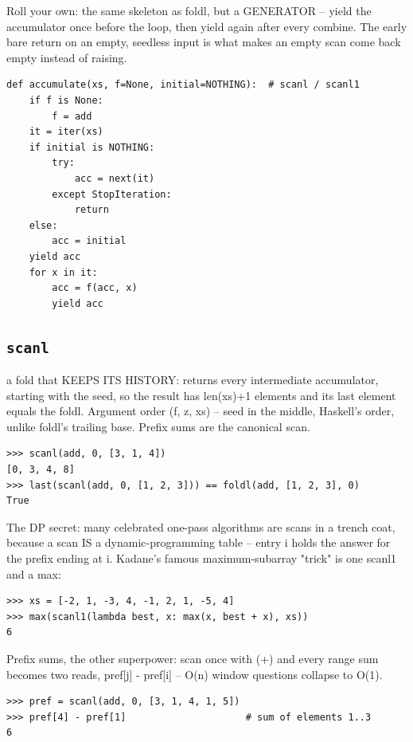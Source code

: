 \documentclass[10pt,letterpaper]{book}
\begin{document}
Roll your own: the same skeleton as foldl, but a GENERATOR -- yield the accumulator once before the loop, then yield again after every combine. The early bare return on an empty, seedless input is what makes an empty scan come back empty instead of raising.

\begin{lstlisting}[style=ex]
def accumulate(xs, f=None, initial=NOTHING):  # scanl / scanl1
    if f is None:
        f = add
    it = iter(xs)
    if initial is NOTHING:
        try:
            acc = next(it)
        except StopIteration:
            return
    else:
        acc = initial
    yield acc
    for x in it:
        acc = f(acc, x)
        yield acc
\end{lstlisting}

\subsection{\texttt{scanl}}\label{def:scanl}
a fold that KEEPS ITS HISTORY: returns every intermediate accumulator, starting with the seed, so the result has len(xs)+1 elements and its last element equals the foldl. Argument order (f, z, xs) -- seed in the middle, Haskell's order, unlike foldl's trailing base. Prefix sums are the canonical scan.
\begin{lstlisting}[style=ex]
>>> scanl(add, 0, [3, 1, 4])
[0, 3, 4, 8]
>>> last(scanl(add, 0, [1, 2, 3])) == foldl(add, [1, 2, 3], 0)
True
\end{lstlisting}

The DP secret: many celebrated one-pass algorithms are scans in a trench coat, because a scan IS a dynamic-programming table -- entry i holds the answer for the prefix ending at i. Kadane's famous maximum-subarray "trick" is one scanl1 and a max:

\begin{lstlisting}[style=ex]
>>> xs = [-2, 1, -3, 4, -1, 2, 1, -5, 4]
>>> max(scanl1(lambda best, x: max(x, best + x), xs))
6
\end{lstlisting}

Prefix sums, the other superpower: scan once with (+) and every range sum becomes two reads, pref[j] - pref[i] -- O(n) window questions collapse to O(1).

\begin{lstlisting}[style=ex]
>>> pref = scanl(add, 0, [3, 1, 4, 1, 5])
>>> pref[4] - pref[1]                     # sum of elements 1..3
6
\end{lstlisting}
\end{document}
